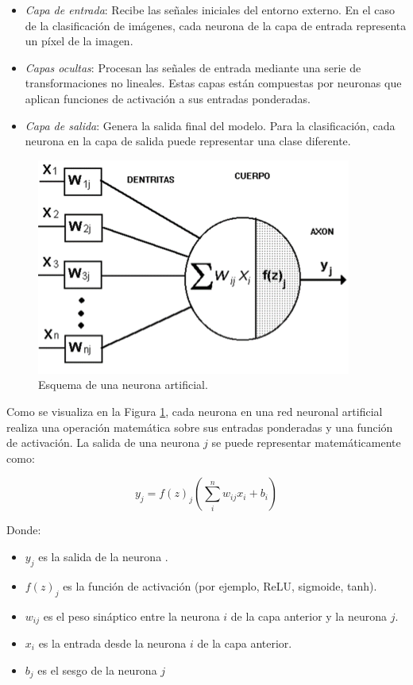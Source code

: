 \documentclass[conference]{IEEEtran}
\begin{document}
\begin{itemize}
	\item \textit{Capa de entrada}: Recibe las señales iniciales del entorno externo. En el caso de la clasificación de imágenes, cada neurona de la capa de entrada representa un píxel de la imagen.
	\item \textit{Capas ocultas}: Procesan las señales de entrada mediante una serie de transformaciones no lineales. Estas capas están compuestas por neuronas que aplican funciones de activación a sus entradas ponderadas.
	\item \textit{Capa de salida}: Genera la salida final del modelo. Para la clasificación, cada neurona en la capa de salida puede representar una clase diferente.
\end{itemize}

\begin{figure}[ht]
	\centering
	\includegraphics[scale=0.55]{img/Neuron.png}
	\caption{Esquema de una neurona artificial.
		\label{fig:neuron}}
\end{figure}

Como se visualiza en la Figura \ref{fig:neuron}, cada neurona en una red neuronal artificial realiza una operación matemática sobre sus entradas ponderadas y una función de activación. La salida de una neurona $j$ se puede representar matemáticamente como:

\begin{equation}
	y_{j} = f(z)_{j} \left( \sum_{i}^{n} w_{ij}x_{i} + b_{i} \right)
	\label{eq:1}
\end{equation}

Donde:

\begin{itemize}
	\item $y_{j}$ es la salida de la neurona .
	\item $f(z)_{j}$ es la función de activación (por ejemplo, ReLU, sigmoide, tanh).
	\item $w_{ij}$ es el peso sináptico entre la neurona $i$ de la capa anterior y la neurona $j$.
	\item $x_{i}$ es la entrada desde la neurona $i$ de la capa anterior.
	\item $b_{j}$ es el sesgo de la neurona $j$
\end{itemize}
\end{document}
